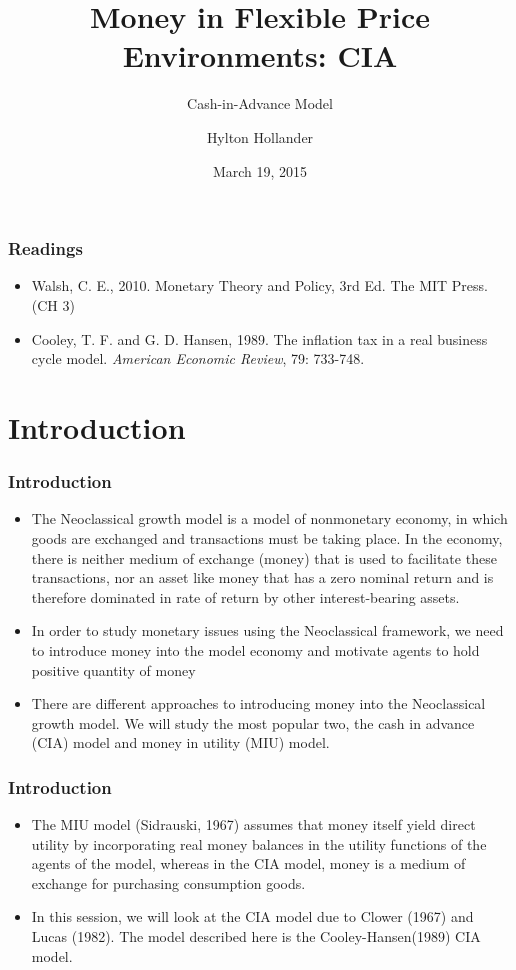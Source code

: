 \documentclass[handout]{beamer}
\title [Money in Flexible Price Environments: CIA]{Money in Flexible Price Environments: CIA}
\subtitle{Cash-in-Advance Model}
\author[H Hollander]{Hylton Hollander}
\institute{}
\date[March 19, 2015]{March 19, 2015}
\begin{document}
\frame{\titlepage}



\begin{frame}

\frametitle{Readings} \vskip 0.1in


\begin{itemize}
\item Walsh, C. E., 2010. Monetary Theory and Policy, 3rd Ed. The MIT Press. (CH 3) \\
\vskip 0.1in
\item Cooley, T. F. and G. D. Hansen, 1989. The inflation tax in a
real business cycle model. \emph{American Economic Review}, 79:
733-748.
\end{itemize}
\end{frame}


\section{Introduction}

\begin{frame}
\frametitle{Introduction} \vskip 0.1in

\begin{itemize}
\item The Neoclassical growth model is a model of nonmonetary
economy, in which goods are exchanged and transactions must be
taking place. In the economy, there is neither medium of exchange
(money) that is used to facilitate these transactions, nor an asset
like money that has a zero nominal return and is therefore dominated
in rate of return by other interest-bearing assets.

\item In order to study monetary issues using the Neoclassical
framework, we need to introduce money into the model economy and
motivate agents to hold positive quantity of money

\item There are different approaches to introducing money into the
Neoclassical growth model. We will study the most popular two, the
cash in advance (CIA) model and money in utility (MIU) model.
\end{itemize}


\end{frame}

\begin{frame}
\frametitle{Introduction} \vskip 0.1in

\begin{itemize}
\item The MIU model (Sidrauski, 1967) assumes that money itself yield direct utility
by incorporating real money balances in the utility functions of the
agents of the model, whereas in the CIA model, money is a medium of
exchange for purchasing consumption goods. \vskip 0.2in

\item In this session, we will look at the CIA model due to Clower
(1967) and Lucas (1982). The model described here is the
Cooley-Hansen(1989) CIA model.
\end{itemize}
\end{frame}
\end{document}
